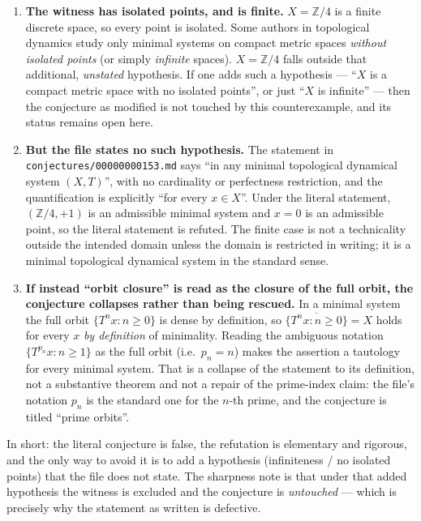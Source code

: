 \documentclass[11pt]{article}
\theoremstyle{definition}
\theoremstyle{remark}
\newcommand{\Z}{\mathbb{Z}}
\begin{document}
\begin{enumerate}
\item \textbf{The witness has isolated points, and is finite.} $X = \Z/4$ is a
finite discrete space, so every point is isolated. Some authors in topological
dynamics study only minimal systems on compact metric spaces \emph{without
isolated points} (or simply \emph{infinite} spaces). $X = \Z/4$ falls outside
that additional, \emph{unstated} hypothesis. If one adds such a hypothesis ---
``$X$ is a compact metric space with no isolated points'', or just ``$X$ is
infinite'' --- then the conjecture as modified is not touched by this
counterexample, and its status remains open here.

\item \textbf{But the file states no such hypothesis.} The statement in
\texttt{conjectures/00000000153.md} says ``in any minimal topological dynamical
system $(X,T)$'', with no cardinality or perfectness restriction, and the
quantification is explicitly ``for every $x \in X$''. Under the literal
statement, $(\Z/4, +1)$ is an admissible minimal system and $x = 0$ is an
admissible point, so the literal statement is refuted. The finite case is not
a technicality outside the intended domain unless the domain is restricted in
writing; it is a minimal topological dynamical system in the standard sense.

\item \textbf{If instead ``orbit closure'' is read as the closure of the full
orbit, the conjecture collapses rather than being rescued.} In a minimal system
the full orbit $\{T^n x : n \ge 0\}$ is dense by definition, so
$\overline{\{T^n x : n \ge 0\}} = X$ holds for every $x$ \emph{by definition}
of minimality. Reading the ambiguous notation $\{T^{p_n}x : n \ge 1\}$ as
the full orbit (i.e.\ $p_n = n$) makes the assertion a tautology for every
minimal system. That is a collapse of the statement to its definition, not a
substantive theorem and not a repair of the prime-index claim: the file's
notation $p_n$ is the standard one for the $n$-th prime, and the conjecture is
titled ``prime orbits''.
\end{enumerate}

In short: the literal conjecture is false, the refutation is elementary and
rigorous, and the only way to avoid it is to add a hypothesis (infiniteness /
no isolated points) that the file does not state. The sharpness note is that
under that added hypothesis the witness is excluded and the conjecture is
\emph{untouched} --- which is precisely why the statement as written is
defective.
\end{document}
